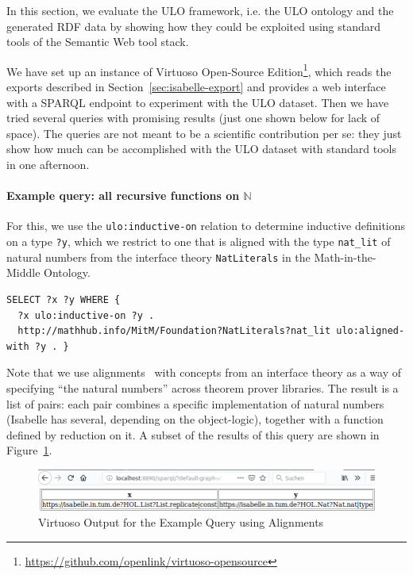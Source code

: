 
In this section, we evaluate the ULO framework, i.e. the ULO ontology and the generated RDF data by showing how they could be exploited using standard tools of the Semantic Web tool stack.

We have set up an instance of Virtuoso Open-Source Edition\footnote{\url{https://github.com/openlink/virtuoso-opensource}}, which reads the exports described in Section~\ref{sec:isabelle-export} and provides a web interface with a SPARQL endpoint to experiment with the ULO dataset.
Then we have tried several queries with promising results (just one shown below for lack of space).
The queries are not meant to be a scientific contribution per se: they just show how much can be accomplished with the ULO dataset with standard tools in one afternoon.

\paragraph{Example query: all recursive functions on $\mathbb{N}$} For this, we use the \lstinline|ulo:inductive-on| relation to determine inductive definitions on a type \lstinline|?y|, which we restrict to one that is aligned with the type \lstinline|nat_lit| of natural numbers from the interface theory \lstinline|NatLiterals| in the Math-in-the-Middle Ontology.
\begin{lstlisting}
SELECT ?x ?y WHERE {
  ?x ulo:inductive-on ?y .
  http://mathhub.info/MitM/Foundation?NatLiterals?nat_lit ulo:aligned-with ?y . }
\end{lstlisting}
Note that we use alignments~\cite{MueGauKal:cacfms17} with concepts from an interface theory as a way of specifying ``the natural numbers'' across theorem prover libraries. The result is a list of pairs: each pair combines a specific implementation of natural numbers (Isabelle has several, depending on the object-logic), together with a function defined by reduction on it. A subset of the results of this query are shown in Figure~\ref{fig:query}.

\begin{figure}[t]\centering
\includegraphics[width=\textwidth]{ulo_queryresult}
\caption{Virtuoso Output for the Example Query using Alignments}\label{fig:query}
\end{figure}


